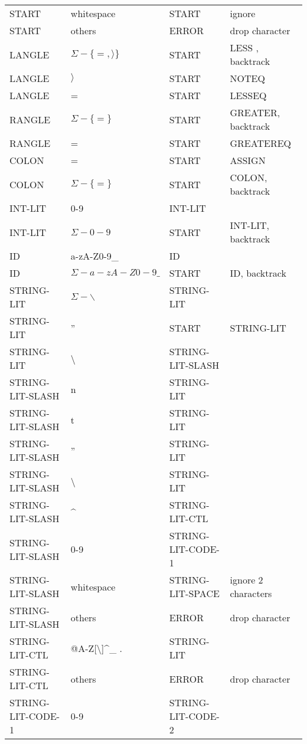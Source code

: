 \documentclass[11pt, fleqn]{article}
\begin{document}
\begin{longtable}{l|l|l|l}
START			&	whitespace						&	START			&	ignore				\\
START			&	others							&	ERROR			&	drop character		\\
LANGLE			&	$\Sigma - \{=, \rangle\}$		&	START			&	LESS	, backtrack		\\
LANGLE			&	$\rangle$						&	START			&	NOTEQ				\\
LANGLE			&	=								&	START			&	LESSEQ				\\
RANGLE			&	$\Sigma - \{=\}$					&	START			&	GREATER, backtrack	\\
RANGLE			&	=								&	START			&	GREATEREQ			\\
COLON			&	=								&	START			&	ASSIGN				\\
COLON			&	$\Sigma - \{=\}$					&	START			&	COLON, backtrack		\\
INT-LIT			&	0-9								&	INT-LIT			&						\\
INT-LIT			&	$\Sigma - 0-9	$				&	START			&	INT-LIT, backtrack	\\
ID				&	a-zA-Z0-9\_						&	ID				&						\\
ID				&	$\Sigma - a-zA-Z0-9\_$			&	START			&	ID, backtrack		\\
STRING-LIT			&	$\Sigma - {\backslash}$	&	STRING-LIT			&						\\
STRING-LIT			&	''						&	START				&	STRING-LIT			\\
STRING-LIT			&	\textbackslash			&	STRING-LIT-SLASH		&						\\
STRING-LIT-SLASH		&	n						&	STRING-LIT			&						\\
STRING-LIT-SLASH		&	t						&	STRING-LIT			&								\\
STRING-LIT-SLASH		&	''						&	STRING-LIT			&								\\
STRING-LIT-SLASH		&	\textbackslash			&	STRING-LIT			&								\\
STRING-LIT-SLASH		&	\textasciicircum			&	STRING-LIT-CTL		&								\\
STRING-LIT-SLASH		&	0-9						&	STRING-LIT-CODE-1	&					\\
STRING-LIT-SLASH		&	whitespace				&	STRING-LIT-SPACE		& ignore 2 characters			\\
STRING-LIT-SLASH		&	others					&	ERROR				& drop character				\\
STRING-LIT-CTL		&	@A-Z[\textbackslash]\textasciicircum\_ .		&	STRING-LIT			&			\\
STRING-LIT-CTL		&	others					&	ERROR				& drop character					\\
STRING-LIT-CODE-1	&	0-9						&	STRING-LIT-CODE-2			&					\\

\end{longtable}
\end{document}
